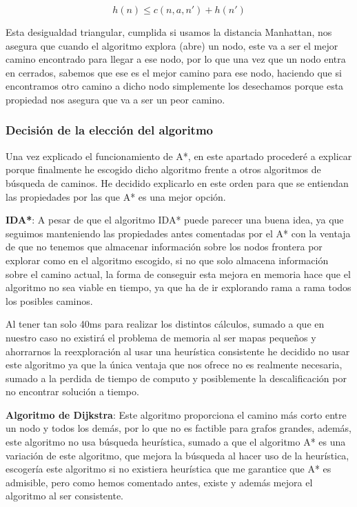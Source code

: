 \documentclass[10pt, spanish]{article}
\begin{document}
$$ h(n) \leq c(n, a, n') + h(n') $$

Esta desigualdad triangular, cumplida si usamos la distancia Manhattan, nos asegura que cuando el algoritmo explora (abre) un nodo, este va a ser el mejor camino encontrado para llegar a ese nodo, por lo que una vez que un nodo entra en cerrados, sabemos que ese es el mejor camino para ese nodo, haciendo que si encontramos otro camino a dicho nodo simplemente los desechamos porque esta propiedad nos asegura que va a ser un peor camino.


\subsubsection{Decisión de la elección del algoritmo}

Una vez explicado el funcionamiento de A*, en este apartado procederé a explicar porque finalmente he escogido dicho algoritmo frente a otros algoritmos de búsqueda de caminos. He decidido explicarlo en este orden para que se entiendan las propiedades por las que A* es una mejor opción.

\textbf{IDA*}: A pesar de que el algoritmo IDA* puede parecer una buena idea, ya que seguimos manteniendo las propiedades antes comentadas por el A* con la ventaja de que no tenemos que almacenar información sobre los nodos frontera por explorar como en el algoritmo escogido, si no que solo almacena información sobre el camino actual, la forma de conseguir esta mejora en memoria hace que el algoritmo no sea viable en tiempo, ya que ha de ir explorando rama a rama todos los posibles caminos.

Al tener tan solo 40ms para realizar los distintos cálculos, sumado a que en nuestro caso no existirá el problema de memoria al ser mapas pequeños y ahorrarnos la reexploración al usar una heurística consistente he decidido no usar este algoritmo ya que la única ventaja que nos ofrece no es realmente necesaria, sumado a la perdida de tiempo de computo y posiblemente la descalificación por no encontrar solución a tiempo.

\textbf{Algoritmo de Dijkstra}: Este algoritmo proporciona el camino más corto entre un nodo y todos los demás, por lo que no es factible para grafos grandes, además, este algoritmo no usa búsqueda heurística, sumado a que el algoritmo A* es una variación de este algoritmo, que mejora la búsqueda al hacer uso de la heurística, escogería este algoritmo si no existiera heurística que me garantice que A* es admisible, pero como hemos comentado antes, existe y además mejora el algoritmo al ser consistente.
\end{document}
